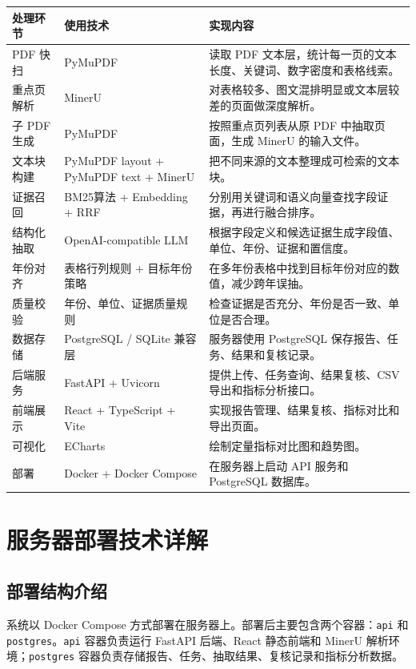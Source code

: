 \documentclass[UTF8,a4paper,12pt]{ctexart}
\newenvironment{manualtable}[1]{%
  \small
  \begin{longtable}{#1}
}{%
  \end{longtable}
  \normalsize
}
\begin{document}
\begin{manualtable}{p{3.2cm}p{4cm}p{7cm}}
\toprule
\textbf{处理环节} & \textbf{使用技术} & \textbf{实现内容} \\
\midrule
\endhead
PDF 快扫 & PyMuPDF & 读取 PDF 文本层，统计每一页的文本长度、关键词、数字密度和表格线索。 \\
重点页解析 & MinerU & 对表格较多、图文混排明显或文本层较差的页面做深度解析。 \\
子 PDF 生成 & PyMuPDF & 按照重点页列表从原 PDF 中抽取页面，生成 MinerU 的输入文件。 \\
文本块构建 & PyMuPDF layout + PyMuPDF text + MinerU & 把不同来源的文本整理成可检索的文本块。 \\
证据召回 & BM25算法 + Embedding + RRF & 分别用关键词和语义向量查找字段证据，再进行融合排序。 \\
结构化抽取 & OpenAI-compatible LLM & 根据字段定义和候选证据生成字段值、单位、年份、证据和置信度。 \\
年份对齐 & 表格行列规则 + 目标年份策略 & 在多年份表格中找到目标年份对应的数值，减少跨年误抽。 \\
质量校验 & 年份、单位、证据质量规则 & 检查证据是否充分、年份是否一致、单位是否合理。 \\
数据存储 & PostgreSQL / SQLite 兼容层 & 服务器使用 PostgreSQL 保存报告、任务、结果和复核记录。 \\
后端服务 & FastAPI + Uvicorn & 提供上传、任务查询、结果复核、CSV 导出和指标分析接口。 \\
前端展示 & React + TypeScript + Vite & 实现报告管理、结果复核、指标对比和导出页面。 \\
可视化 & ECharts & 绘制定量指标对比图和趋势图。 \\
部署 & Docker + Docker Compose & 在服务器上启动 API 服务和 PostgreSQL 数据库。 \\
\bottomrule
\end{manualtable}

\section{服务器部署技术详解}

\subsection{部署结构介绍}

系统以 Docker Compose 方式部署在服务器上。部署后主要包含两个容器：\texttt{api} 和 \texttt{postgres}。\texttt{api} 容器负责运行 FastAPI 后端、React 静态前端和 MinerU 解析环境；\texttt{postgres} 容器负责存储报告、任务、抽取结果、复核记录和指标分析数据。
\end{document}
